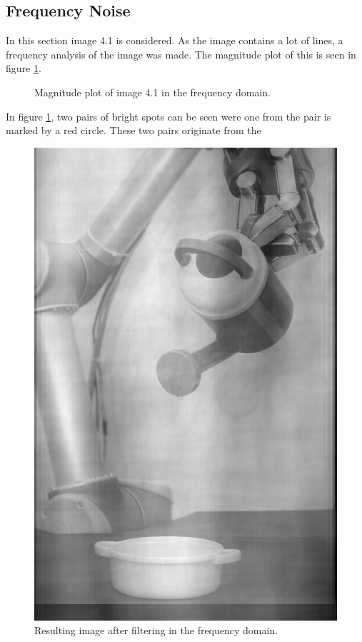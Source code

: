 \subsection{Frequency Noise}
In this section image 4.1 is considered.
As the image contains a lot of lines, a frequency analysis of the image was made.
The magnitude plot of this is seen in figure \ref{fig:freq_analysis_p4}.


\begin{figure}[H]
\centering
{}

\caption{Magnitude plot of image 4.1 in the frequency domain.}
\label{fig:freq_analysis_p4}
\end{figure}




In figure \ref{fig:freq_analysis_p4}, two pairs of bright spots can be seen were one from the pair is marked by a red circle.
These two pairs originate from the 




\begin{figure}[H]
\centering
\includegraphics[width = 0.9 \linewidth]{../code/images/image_result_04.png}
\caption{Resulting image after filtering in the frequency domain.}
\label{fig:hist_pepper}
\end{figure}
